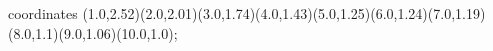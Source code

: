 					coordinates { (1.0,2.52)(2.0,2.01)(3.0,1.74)(4.0,1.43)(5.0,1.25)(6.0,1.24)(7.0,1.19)(8.0,1.1)(9.0,1.06)(10.0,1.0)};